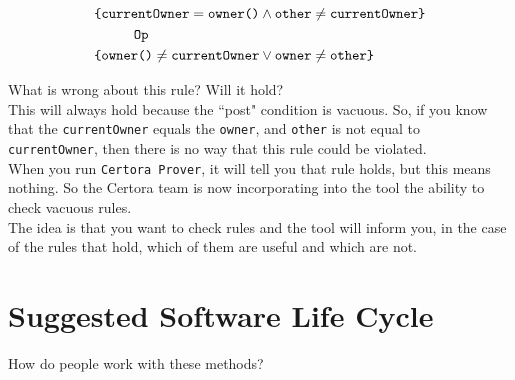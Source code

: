 \documentclass[oneside]{book}
\begin{document}
    \begin{align*}
        &\text{\texttt{\{currentOwner}} = \text{\texttt{owner()}}\wedge\text{\texttt{other}}\neq\text{\texttt{currentOwner\}}}\\
        &\hspace{1cm}\text{\texttt{Op}}\\
        &\text{\texttt{\{owner()}}\neq\text{\texttt{currentOwner}}\vee\text{\texttt{owner}}\neq\text{\texttt{other\}}}\\
    \end{align*}

    What is wrong about this rule? Will it hold?\\

    This will always hold because the ``post" condition is vacuous.
    So, if you know that the \texttt{currentOwner} equals the \texttt{owner}, and \texttt{other} is not equal to \texttt{currentOwner}, then there is no way that this rule could be violated.\\

    When you run \texttt{Certora Prover}, it will tell you that rule holds, but this means nothing.
    So the Certora team is now incorporating into the tool the ability to check vacuous rules.\\

    The idea is that you want to check rules and the tool will inform you, in the case of the rules that hold, which of them are useful and which are not.

    \section{Suggested Software Life Cycle}

    How do people work with these methods?
\end{document}

